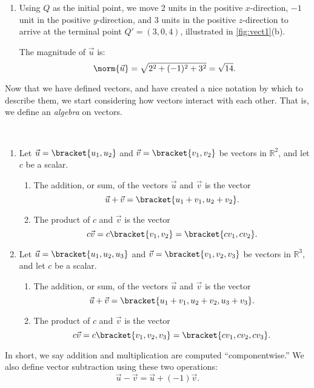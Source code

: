 \begin{example}
\begin{enumerate}
	\item	Using $Q$ as the initial point, we move 2 units in the positive $x$-direction, $-1$ unit in the positive $y$-direction, and 3 units in the positive $z$-direction to arrive at the terminal point $Q' = (3,0,4)$, illustrated in \autoref{fig:vect1}(b).
	
	The magnitude of $\vec u$ is:
	\[\norm{\vec u} = \sqrt{2^2+(-1)^2+3^2} = \sqrt{14}.\]
\end{enumerate}
\end{example}

Now that we have defined vectors, and have created a nice notation by which to describe them, we start considering how vectors interact with each other. That is, we define an \emph{algebra} on vectors.

\begin{definition}\label{def:vector_algebra}
\mbox{}\\[-2\baselineskip]\parbox[t]{\linewidth}{\begin{enumerate}
	\item Let $\vec u =\bracket{u_1,u_2}$ and $\vec v =\bracket{v_1,v_2}$ be vectors in $\mathbb{R}^2$, and let $c$ be a scalar.
		\begin{enumerate}
			\item The addition, or sum, of the vectors $\vec u$ and $\vec v$ is the vector
			\[\vec u+\vec v =\bracket{u_1+v_1, u_2+v_2}.\]
			\item	The product of $c$ and $\vec v$ is the vector 
			\[c\vec v = c\bracket{v_1,v_2}=\bracket{cv_1,cv_2}.\]
		\end{enumerate}
	\item Let $\vec u =\bracket{u_1,u_2,u_3}$ and $\vec v =\bracket{v_1,v_2,v_3}$ be vectors in $\mathbb{R}^3$, and let $c$ be a scalar. 
		\begin{enumerate}
			\item The addition, or sum, of the vectors $\vec u$ and $\vec v$ is the vector
			\[\vec u+\vec v =\bracket{u_1+v_1, u_2+v_2, u_3+v_3}.\]
			\item	The product of $c$ and $\vec v$ is the vector 
			\[c\vec v = c\bracket{v_1,v_2,v_3}=\bracket{cv_1,cv_2,cv_3}.\]
		\end{enumerate}
\end{enumerate}}
\end{definition}

In short, we say addition and multiplication are computed ``componentwise.''  We also define vector subtraction using these two operations:
\[\vec u-\vec v = \vec u + (-1)\vec v.\]

